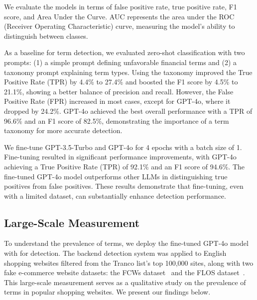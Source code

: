  We evaluate the models in terms of false positive rate, true positive rate, F1 score, and Area Under the Curve. AUC represents the area under the ROC (Receiver Operating Characteristic) curve, measuring the model's ability to distinguish between classes.






As a baseline for \termname term detection, we evaluated zero-shot classification with two prompts: (1) a simple prompt defining unfavorable financial terms and (2) a taxonomy prompt explaining term types. Using the taxonomy improved the True Positive Rate (TPR) by 4.4\% to 27.4\% and boosted the F1 score by 4.5\% to 21.1\%, showing a better balance of precision and recall. However, the False Positive Rate (FPR) increased in most cases, except for GPT-4o, where it dropped by 24.2\%. GPT-4o achieved the best overall performance with a TPR of 96.6\% and an F1 score of 82.5\%, demonstrating the importance of a \termname term taxonomy for more accurate detection.




We fine-tune GPT-3.5-Turbo and GPT-4o for 4 epochs with a batch size of 1. Fine-tuning resulted in significant performance improvements, with GPT-4o achieving a True Positive Rate (TPR) of 92.1\% and an F1 score of 94.6\%. The fine-tuned GPT-4o model outperforms other LLMs in distinguishing true positives from false positives. These results demonstrate that fine-tuning, even with a limited dataset, can substantially enhance detection performance.




\subsection{Large-Scale Measurement}
\label{sec:findings}


To understand the prevalence of \termname terms, we deploy the fine-tuned GPT-4o model with \platform for detection. The backend detection system was applied to English shopping websites filtered from the Tranco list's top 100,000 sites, along with two fake e-commerce website datasets: the FCWs dataset~\citep{bitaab2023beyond} and the FLOS dataset~\citep{janaviciute2023fraudulent}. This large-scale measurement serves as a qualitative study on the prevalence of \termname terms in popular shopping websites. We present our findings below. %


